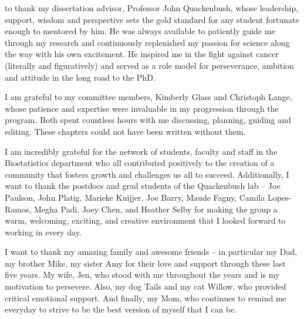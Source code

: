 
 to thank my dissertation advisor, Professor John Quackenbush, whose leadership, support, wisdom and perspective sets the gold standard for any student fortunate enough to mentored by him. He was always available to patiently guide me through my research and continuously replenished my passion for science along the way with his own excitement.  He inspired me in the fight against cancer (literally and figuratively) and served as a role model for perseverance, ambition and attitude in the long road to the PhD.  

I am grateful to my committee members, Kimberly Glass and Christoph Lange, whose patience and expertise were invaluable in my progression through the program.  Both spent countless hours with me discussing, planning, guiding and editing. These chapters could not have been written without them.

I am incredibly grateful for the network of students, faculty and staff in the Biostatistics department who all contributed positively to the creation of a community that fosters growth and challenges us all to succeed. Additionally, I want to thank the postdocs and grad students of the Quackenbush lab – Joe Paulson, John Platig, Marieke Kuijjer, Joe Barry, Maude Fagny, Camila Lopes-Ramos, Megha Padi, Joey Chen, and Heather Selby for making the group a warm, welcoming, exciting, and creative environment that I looked forward to working in every day.

I want to thank my amazing family and awesome friends – in particular my Dad, my brother Mike, my sister Amy for their love and support through these last five years.  My wife, Jen, who stood with me throughout the years and is my motivation to persevere. Also, my dog Tails and my cat Willow, who provided critical emotional support.  And finally, my Mom, who continues to remind me everyday to strive to be the best version of myself that I can be.